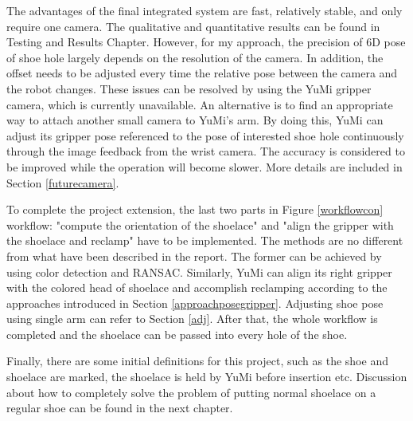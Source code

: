 The advantages of the final integrated system are fast, relatively stable, and only require one camera. The qualitative and quantitative results can be found in Testing and Results Chapter. However, for my approach, the precision of 6D pose of shoe hole largely depends on the resolution of the camera. In addition, the offset needs to be adjusted every time the relative pose between the camera and the robot changes. These issues can be resolved by using the YuMi gripper camera, which is currently unavailable. An alternative is to find an appropriate way to attach another small camera to YuMi's arm. By doing this, YuMi can adjust its gripper pose referenced to the pose of interested shoe hole continuously through the image feedback from the wrist camera. The accuracy is considered to be improved while the operation will become slower. More details are included in Section \ref{futurecamera}.



To complete the project extension, the last two parts in Figure \ref{workflowcon} workflow: "compute the orientation of the shoelace" and "align the gripper with the shoelace and reclamp" have to be implemented. The methods are no different from what have been described in the report. The former can be achieved by using color detection and RANSAC. Similarly, YuMi can align its right gripper with the colored head of shoelace and accomplish reclamping according to the approaches introduced in Section \ref{approachposegripper}. Adjusting shoe pose using single arm can refer to Section \ref{adj}. After that, the whole workflow is completed and the shoelace can be passed into every hole of the shoe.

Finally, there are some initial definitions for this project, such as the shoe and shoelace are marked, the shoelace is held by YuMi before insertion etc. Discussion about how to completely solve the problem of putting normal shoelace on a regular shoe can be found in the next chapter. 


